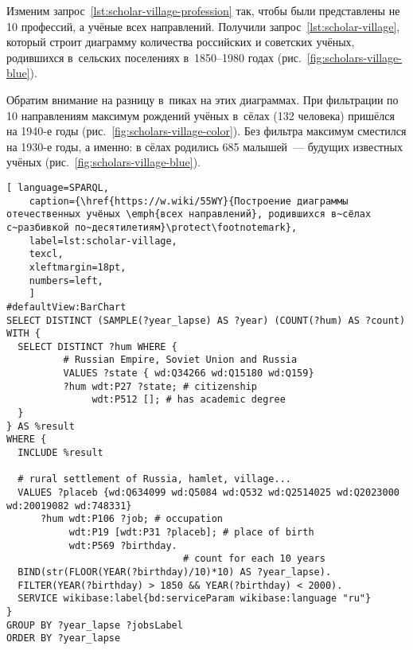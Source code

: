 \newpage
Изменим запрос~\ref{lst:scholar-village-profession} так, 
чтобы были представлены не 10 профессий, а учёные всех направлений. 
Получили запрос~\ref{lst:scholar-village}, 
который строит диаграмму количества российских и советских учёных, 
родившихся в~сельских поселениях в~1850--1980 годах (рис.~\ref{fig:scholars-village-blue}). 

Обратим внимание на разницу в~пиках на этих диаграммах. 
При фильтрации по 10 направлениям максимум рождений учёных в~сёлах (132 человека) 
пришёлся на 1940-е годы (рис.~\ref{fig:scholars-village-color}). 
Без фильтра максимум сместился на 1930-е годы, а именно: 
в сёлах родились 685 малышей~--- будущих известных учёных (рис.~\ref{fig:scholars-village-blue}). 



\begin{lstlisting}[ language=SPARQL, 
    caption={\href{https://w.wiki/55WY}{Построение диаграммы отечественных учёных \emph{всех направлений}, родившихся в~сёлах с~разбивкой по~десятилетиям}\protect\footnotemark},
    label=lst:scholar-village,
    texcl,
    xleftmargin=18pt, 
    numbers=left,
    ]
#defaultView:BarChart
SELECT DISTINCT (SAMPLE(?year_lapse) AS ?year) (COUNT(?hum) AS ?count) 
WITH {
  SELECT DISTINCT ?hum WHERE {
          # Russian Empire, Soviet Union and Russia
          VALUES ?state { wd:Q34266 wd:Q15180 wd:Q159}
          ?hum wdt:P27 ?state; # citizenship
               wdt:P512 []; # has academic degree 
  }
} AS %result
WHERE {
  INCLUDE %result

  # rural settlement of Russia, hamlet, village...
  VALUES ?placeb {wd:Q634099 wd:Q5084 wd:Q532 wd:Q2514025 wd:Q2023000 wd:20019082 wd:748331}
      ?hum wdt:P106 ?job; # occupation
           wdt:P19 [wdt:P31 ?placeb]; # place of birth
           wdt:P569 ?birthday.
                               # count for each 10 years
  BIND(str(FLOOR(YEAR(?birthday)/10)*10) AS ?year_lapse). 
  FILTER(YEAR(?birthday) > 1850 && YEAR(?birthday) < 2000).
  SERVICE wikibase:label{bd:serviceParam wikibase:language "ru"}
}
GROUP BY ?year_lapse ?jobsLabel
ORDER BY ?year_lapse
\end{lstlisting}%


